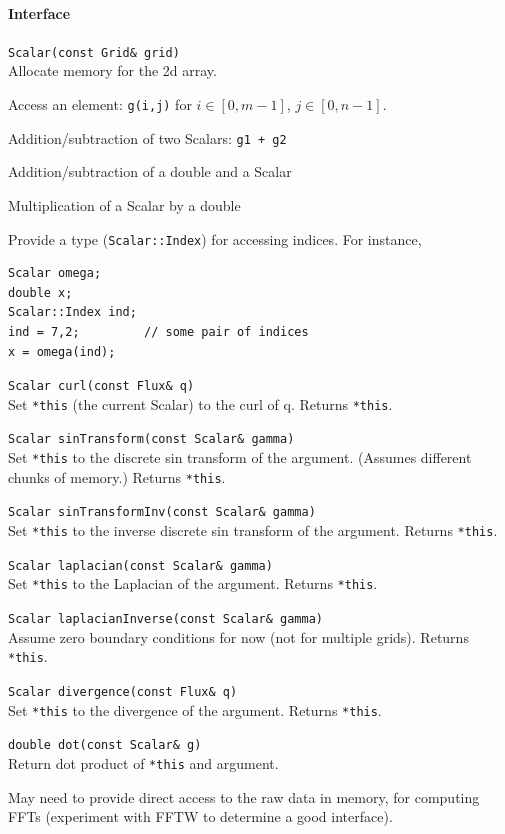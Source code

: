 \documentclass[11pt]{article}
\let\code\lstinline
\begin{document}
\paragraph{Interface}
\begin{description}
	\item \code|Scalar(const Grid& grid)|\\
	Allocate memory for the 2d array.
	\item Access an element: \code|g(i,j)| for $i\in[0,m-1]$, $j\in[0,n-1]$.
	\item Addition/subtraction of two Scalars: \code|g1 + g2|
	\item Addition/subtraction of a double and a Scalar
	\item Multiplication of a Scalar by a double
	\item Provide a type (\code|Scalar::Index|) for accessing indices.  For instance,
	\begin{lstlisting}
Scalar omega;
double x;
Scalar::Index ind;
ind = 7,2;         // some pair of indices
x = omega(ind);
	\end{lstlisting}
	\item \code|Scalar curl(const Flux& q)|\\
	Set \code|*this| (the current Scalar) to the curl of q.  Returns \code|*this|.
	\item \code|Scalar sinTransform(const Scalar& gamma)|\\
	Set \code|*this| to the discrete sin transform of the argument.  (Assumes different chunks of memory.)   Returns \code|*this|.
	\item \code|Scalar sinTransformInv(const Scalar& gamma)|\\
	Set \code|*this| to the inverse discrete sin transform of the argument.   Returns \code|*this|.
	\item \code|Scalar laplacian(const Scalar& gamma)|\\
	Set \code|*this| to the Laplacian of the argument.   Returns \code|*this|.
	\item \code|Scalar laplacianInverse(const Scalar& gamma)|\\
	Assume zero boundary conditions for now (not for multiple grids).   Returns \code|*this|.
	\item \code|Scalar divergence(const Flux& q)|\\
	Set \code|*this| to the divergence of the argument.   Returns \code|*this|.
	\item \code|double dot(const Scalar& g)|\\
	Return dot product of \code|*this| and argument.
	\item May need to provide direct access to the raw data in memory, for computing FFTs (experiment with FFTW to determine a good interface).
\end{description}
\end{document}
